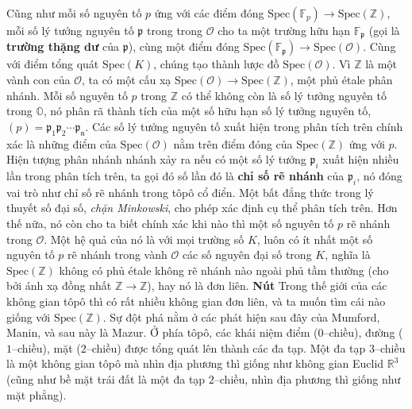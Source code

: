 \begin{multicols}{2}
	\vskip 0.1cm
	Cũng như mỗi số nguyên tố $p$ ứng với các điểm đóng $\text{Spec}(\mathbb{F}_p) \to \text{Spec}(\mathbb{Z})$, mỗi số lý tưởng nguyên tố $\mathfrak{p}$ trong trong $\mathcal{O}$ cho ta một trường hữu hạn $\mathbb{F}_{\mathfrak{p}}$ (gọi là {\bf\color{duongvaotoanhoc} trường thặng dư} của $\mathfrak{p}$), cùng một điểm đóng $\text{Spec}(\mathbb{F}_{\mathfrak{p}}) \to \text{Spec}(\mathcal{O})$. Cùng với điểm tổng quát $\text{Spec}(K)$, chúng tạo thành lược đồ $\text{Spec}(\mathcal{O})$. Vì $\mathbb{Z}$ là một vành con của $\mathcal{O}$, ta có một cấu xạ $\text{Spec}(\mathcal{O}) \to \text{Spec}(\mathbb{Z})$, một phủ étale phân nhánh. Mỗi số nguyên tố $p$ trong $\mathbb{Z}$ có thể không còn là số lý tưởng nguyên tố trong $\mathbb{O}$, nó phân rã thành tích của một số hữu hạn số lý tưởng nguyên tố, $(p) = \mathfrak{p_1}\mathfrak{p_2}\cdots\mathfrak{p_n}$. Các số lý tưởng nguyên tố xuất hiện trong phân tích trên chính xác là những điểm của $\text{Spec}(\mathcal{O})$ nằm trên điểm đóng của $\text{Spec}(\mathbb{Z})$ ứng với $p$. Hiện tượng phân nhánh nhánh xảy ra nếu có một số lý tưởng $\mathfrak{p}_i$ xuất hiện nhiều lần trong phân tích trên, ta gọi đó số lần đó là {\bf\color{duongvaotoanhoc} chỉ số rẽ nhánh} của $\mathfrak{p}_i$, nó đóng vai trò như chỉ số rẽ nhánh trong tôpô cổ điển.
	\vskip 0.1cm
	Một bất đẳng thức trong lý thuyết số đại số, {\it chặn Minkowski}, cho phép xác định cụ thể phân tích trên. Hơn thế nữa, nó còn cho ta biết chính xác khi nào thì một số nguyên tố $p$ rẽ nhánh trong $\mathcal{O}$. Một hệ quả của nó là với mọi trường số $K$, luôn có ít nhất một số nguyên tố $p$ rẽ nhánh trong vành $\mathcal{O}$ các số nguyên đại số trong $K$, nghĩa là $\text{Spec}(\mathbb{Z})$ không có phủ  étale không rẽ nhánh nào ngoài phủ tầm thường (cho bởi ánh xạ đồng nhất $\mathbb{Z} \to \mathbb{Z}$), hay nó là đơn liên.
	\vskip 0.1cm
	\textbf{\color{duongvaotoanhoc}Nút}
	\vskip 0.1cm
	Trong thế giới của các không gian tôpô thì có rất nhiều không gian đơn liên, và ta muốn tìm cái nào giống với $\text{Spec}(\mathbb{Z})$. Sự đột phá nằm ở các phát hiện sau đây của Mumford, Manin, và sau này là Mazur. Ở phía tôpô, các khái niệm điểm ($0$--chiều), đường ($1$--chiều), mặt ($2$--chiều) được tổng quát lên thành các đa tạp. Một đa tạp $3$--chiều là một không gian tôpô mà nhìn địa phương thì giống như không gian Euclid $\mathbb{R}^3$ (cũng như bề mặt trái đất là một đa tạp $2$--chiều, nhìn địa phương thì giống như mặt phẳng).
	\vskip 0.1cm

\end{multicols}
